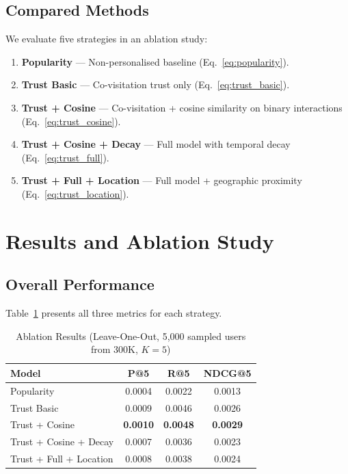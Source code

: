\documentclass[conference]{IEEEtran}
\begin{document}
\subsection{Compared Methods}
We evaluate five strategies in an ablation study:
\begin{enumerate}
  \item \textbf{Popularity} --- Non-personalised baseline
        (Eq.~\ref{eq:popularity}).
  \item \textbf{Trust Basic} --- Co-visitation trust only
        (Eq.~\ref{eq:trust_basic}).
  \item \textbf{Trust + Cosine} --- Co-visitation + cosine similarity on
        binary interactions (Eq.~\ref{eq:trust_cosine}).
  \item \textbf{Trust + Cosine + Decay} --- Full model with temporal decay
        (Eq.~\ref{eq:trust_full}).
  \item \textbf{Trust + Full + Location} --- Full model + geographic
        proximity (Eq.~\ref{eq:trust_location}).
\end{enumerate}


\section{Results and Ablation Study}
\label{sec:results}

\subsection{Overall Performance}

Table~\ref{tab:results} presents all three metrics for each strategy.

\begin{table}[h]
\centering
\caption{Ablation Results (Leave-One-Out, 5{,}000 sampled users from 300K, $K{=}5$)}
\label{tab:results}
\begin{tabular}{lccc}
\toprule
\textbf{Model} & \textbf{P@5} & \textbf{R@5} & \textbf{NDCG@5} \\
\midrule
Popularity              & 0.0004 & 0.0022 & 0.0013 \\
Trust Basic             & 0.0009 & 0.0046 & 0.0026 \\
Trust + Cosine          & \textbf{0.0010} & \textbf{0.0048} & \textbf{0.0029} \\
Trust + Cosine + Decay  & 0.0007 & 0.0036 & 0.0023 \\
Trust + Full + Location & 0.0008 & 0.0038 & 0.0024 \\
\bottomrule
\end{tabular}
\end{table}
\end{document}
